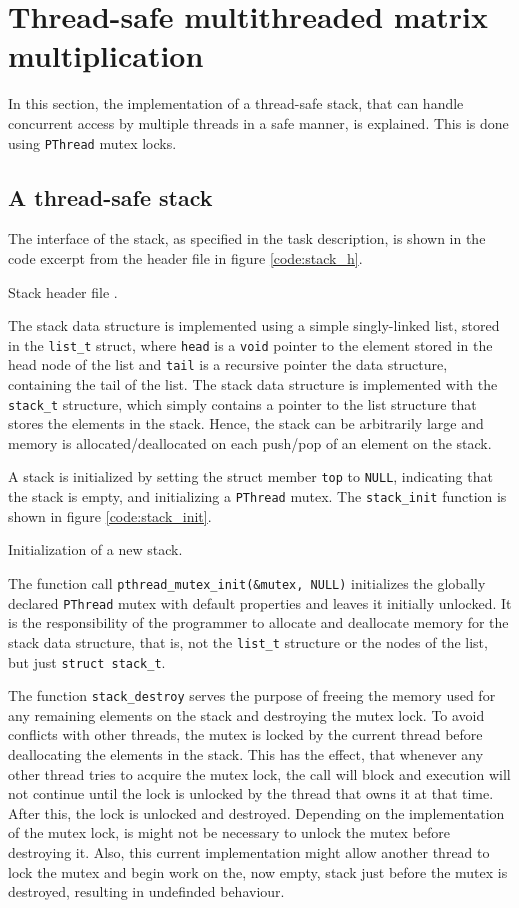 %
%
%
\section{Thread-safe multithreaded matrix multiplication}
In this section, the implementation of a thread-safe stack, that can handle
concurrent access by multiple threads in a safe manner, is explained. This is
done using \verb|PThread| mutex locks.

\subsection{A thread-safe stack}
The interface of the stack, as specified
in the task description, is shown in the code excerpt from the header file
 in figure \ref{code:stack_h}.

        {Stack header file .}

The stack data structure is implemented using a simple singly-linked list,
stored in the \verb|list_t| struct, where \verb|head| is a \verb|void| pointer
to the element stored in the head node of the list and \verb|tail| is a
recursive pointer the data structure, containing the tail of the list.
The stack data structure is implemented with the \verb|stack_t| structure, which
simply contains a pointer to the list structure that stores the elements in the
stack. Hence, the stack can be arbitrarily large and memory is
allocated/deallocated on each push/pop of an element on the stack.

A stack is initialized by setting the struct member \verb|top| to \verb|NULL|,
indicating that the stack is empty, and initializing a \verb|PThread| mutex.
The \verb|stack_init| function is shown in figure \ref{code:stack_init}.

        {Initialization of a new stack.}

The function call \verb|pthread_mutex_init(&mutex, NULL)| initializes the
globally declared \verb|PThread| mutex with default properties and leaves it
initially unlocked. It is the responsibility of the programmer to allocate
and deallocate memory for the stack data structure, that is, not the
\verb|list_t| structure or the nodes of the list, but just \verb|struct stack_t|.

The function \verb|stack_destroy| serves the purpose of freeing the memory used
for any remaining elements on the stack and destroying the mutex lock. To avoid
conflicts with other threads, the mutex is locked by the current thread before
deallocating the elements in the stack. This has the effect, that whenever any
other thread tries to acquire the mutex lock, the call will block and execution
will not continue until the lock is unlocked by the thread that owns it at that
time. After this, the lock is unlocked and destroyed. Depending on the
implementation of the mutex lock, is might not be necessary to unlock the mutex
before destroying it. Also, this current implementation might allow another
thread to lock the mutex and begin work on the, now empty, stack just before the
mutex is destroyed, resulting in undefinded behaviour.


